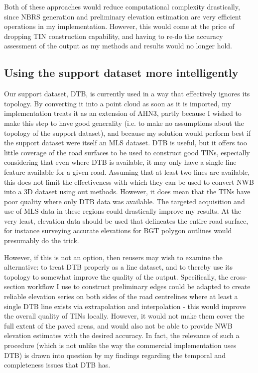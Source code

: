 Both of these approaches would reduce computational complexity drastically, since NBRS generation and preliminary elevation estimation are very efficient operations in my implementation. However, this would come at the price of dropping TIN construction capability, and having to re-do the accuracy assessment of the output as my methods and results would no longer hold.

\subsection{Using the support dataset more intelligently}
\label{sub:improvementssupportdataset}

Our support dataset, DTB, is currently used in a way that effectively ignores its topology. By converting it into a point cloud as soon as it is imported, my implementation treats it as an extension of AHN3, partly because I wished to make this step to have good generality (i.e. to make no assumptions about the topology of the support dataset), and because my solution would perform best if the support dataset were itself an MLS dataset. DTB is useful, but it offers too little coverage of the road surfaces to be used to construct good TINs, especially considering that even where DTB is available, it may only have a single line feature available for a given road. Assuming that at least two lines are available, this does not limit the effectiveness with which they can be used to convert NWB into a 3D dataset using out methods. However, it does mean that the TINs have poor quality where only DTB data was available. The targeted acquisition and use of MLS data in these regions could drastically improve my results. At the very least, elevation data should be used that delineates the entire road surface, for instance surveying accurate elevations for BGT polygon outlines would presumably do the trick.

However, if this is not an option, then reusers may wish to examine the alternative: to treat DTB properly as a line dataset, and to thereby use its topology to somewhat improve the quality of the output. Specifically, the cross-section workflow I use to construct preliminary edges could be adapted to create reliable elevation series on both sides of the road centrelines where at least a single DTB line exists via extrapolation and interpolation - this would improve the overall quality of TINs locally. However, it would not make them cover the full extent of the paved areas, and would also not be able to provide NWB elevation estimates with the desired accuracy. In fact, the relevance of such a procedure (which is not unlike the way the commercial implementation uses DTB) is drawn into question by my findings regarding the temporal and completeness issues that DTB has.